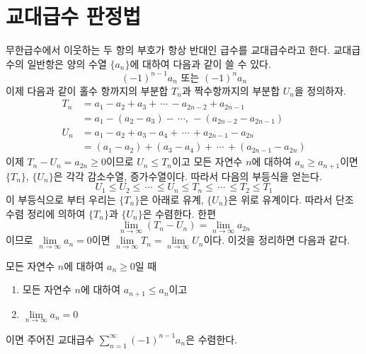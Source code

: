 \documentclass[11pt, a4paper]{book}
\begin{document}
\section{교대급수 판정법}

무한급수에서 이웃하는 두 항의 부호가 항상 반대인 급수를 {\color{red}교대급수}라고 한다. 교대급수의 일반항은 양의 수열 $\{a_{n}\}$에 대하여 다음과 같이 쓸 수 있다.
\begin{equation*}
	(-1)^{n-1}a_{n} \text{ 또는 } (-1)^{n}a_{n}
\end{equation*}
이제 다음과 같이 홀수 항까지의 부분합 $T_{n}$과 짝수항까지의 부분합 $U_{n}$을 정의하자.
\begin{align*}
	T_{n} & = a_{1}-a_{2} + a_3 + \, \cdots \, -a_{2n-2} + a_{2n-1} \\
	&= a_1 -(a_2 -a_3 ) - \, \cdots, \,-(a_{2n-2}-a_{2n-1})\\
	U_{n} & =a_{1}-a_{2} + a_3 -a_4 + \, \cdots \, +a_{2n-1} - a_{2n}\\
	&= (a_1 -a_2 ) + (a_3 -a_4 ) + \, \cdots \, + (a_{2n-1}-a_{2n} )
\end{align*}
이제 $T_{n}- U_{n} =a_{2n}\ge 0$이므로 $U_{n} \le T_{n}$이고 모든 자연수 $n$에 대하여 $a_{n} \ge a_{n+1}$이면 $\{T_n\}$, $\{U_{n}\}$은 각각 감소수열, 증가수열이다. 따라서 다음의 부등식을 얻는다.
\begin{equation*}
	U_1 \le U_2 \le \, \cdots \, \le U_n \le T_n \le \, \cdots \, \le T_2 \le T_1
\end{equation*}
이 부등식으로 부터 우리는 $\{T_n\}$은 아래로 유계, $\{U_n\}$은 위로 유계이다. 
따라서 단조수렴 정리에 의하여 $\{T_n\}$과 $\{U_n\}$은  수렴한다. 한편
\begin{equation*}
	\lim\limits_{n \to \infty}(T_n - U_n ) = \lim\limits_{n \to \infty}a_{2n}
\end{equation*}
이므로 $\lim\limits_{n \to \infty}a_n =0$이면 $\lim\limits_{n\to\infty}T_n = \lim\limits_{n\to\infty}U_n $이다. 이것을 정리하면 다음과 같다.
\vspace{1em}
\begin{theorem}
	모든 자연수 $n$에 대하여 $a_{n} \ge 0$일 때
	\begin{enumerate}
		\item 모든 자연수 $n$에 대하여 $a_{n+1} \le a_n$이고
		\item $\lim\limits_{n\to\infty}a_{n}=0$
	\end{enumerate}
이면 주어진 교대급수 $\displaystyle \sum_{n=1}^{\infty}(-1)^{n-1}a_{n}$은 수렴한다.
\end{theorem}
\end{document}
